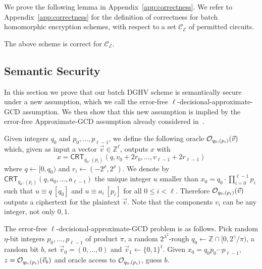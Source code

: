 \documentclass[11pt]{llncs}
\renewcommand\leq\leqslant
\newcommand{\Z}{{\mathbb Z}}
\newcommand*{\crt}{\ensuremath{\mathsf{CRT}}}
\begin{document}
We prove the following lemma in Appendix~\ref{app:correctness}. We refer
to Appendix~\ref{app:correctness} for the definition of correctness for
batch homomorphic encryption schemes, with respect to a set
$\mathcal{C_E}$ of permitted circuits.

\begin{lemma}\label{lem:correctness}
The above scheme is correct for $\mathcal{C_E}$.
\end{lemma}

\subsection{Semantic Security}\label{sec:semantic-security}

In this section we prove that our batch DGHV scheme is semantically
secure under a new assumption, which we call the
error-free $\ell$-decisional-approximate-GCD assumption. We then show that this
new assumption is implied by the error-free Approximate-GCD assumption
already considered in~\cite{CMNT2011,CNT2012}.

Given integers $q_0$ and $p_0,\ldots,p_{\ell-1}$, we define the following oracle
${\cal O}_{q_0,(p_i)}(\vec{v})$ which, given as input a vector $\vec{v} \in {\mathbb
  Z}^\ell$, outputs $x$ with
$$ x = \crt_{q_0,(p_i)}(q,v_0+2r_0,\ldots,v_{\ell-1}+2r_{\ell-1})$$
where $q \leftarrow [0,q_0)$ and $r_i \leftarrow
    (-2^\rho,2^\rho)$. We denote by
$\crt_{q_0,(p_i)}(q,a_0,\ldots,a_{\ell-1})$ the unique
  integer $u$ smaller than $x_0=q_0 \cdot \prod_{i=0}^{\ell-1} p_i$ such
  that $u \equiv q~[q_0]$ and $u \equiv a_i~[p_i]$ for
  all $0 \leq i < \ell$. Therefore ${\cal O}_{q_0,(p_i)}(\vec{v})$
    outputs a ciphertext for the plaintext $\vec{v}$. Note that the
    components $v_i$ can be any integer, not only $0,1$.

\begin{definition} The
  error-free $\ell$-decisional-approximate-GCD problem is as
  follows. Pick random $\eta$-bit 
  integers $p_0,\ldots,p_{\ell-1}$ of product $\pi$, a random
  $2^{\lambda^2}$-rough $q_0 \leftarrow \Z \cap  
  [0,2^{\gamma}/\pi)$, a random bit $b$, set $\vec{v}_0=
  (0,\ldots,0)$
and $\vec{v}_1\leftarrow
  \{0,1\}^\ell$. Given  $x_0=q_0p_0\cdots p_{\ell-1}$, $z={\cal O}_{q_0,(p_i)}(\vec{v}_b)$ and oracle access to ${\cal
    O}_{q_0,(p_i)}$, guess $b$.
\end{definition}
 
\end{document}
